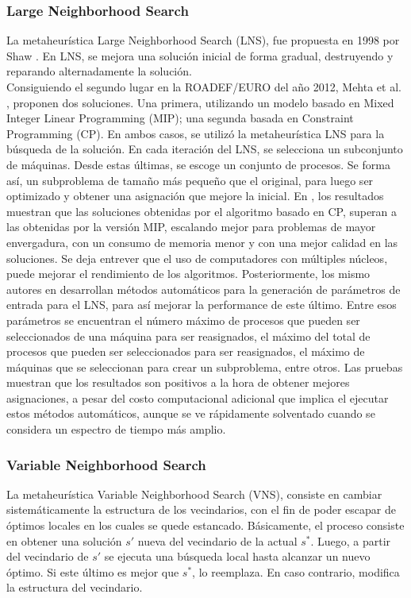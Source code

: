\documentclass[../informe2.tex]{subfiles}
\begin{document}
\subsubsection{Large Neighborhood Search}
La metaheurística Large Neighborhood Search (LNS), fue propuesta en 1998 por Shaw \cite{shaw1998using}. En LNS, se mejora una solución inicial de forma gradual, destruyendo y reparando alternadamente la solución.\\
Consiguiendo el segundo lugar en la ROADEF/EURO del año 2012, Mehta et al. \cite{mehta2012comparing}, proponen dos soluciones. Una primera, utilizando un modelo basado en Mixed Integer Linear Programming (MIP); una segunda basada en Constraint Programming (CP). En ambos casos, se utilizó la metaheurística LNS para la búsqueda de la solución. En cada iteración del LNS, se selecciona un subconjunto de máquinas. Desde estas últimas, se escoge un conjunto de procesos. Se forma así, un subproblema de tamaño más pequeño que el original, para luego ser optimizado y obtener una asignación que mejore la inicial.
En \cite{mehta2012comparing}, los resultados muestran que las soluciones obtenidas por el algoritmo basado en CP, superan a las obtenidas por la versión MIP, escalando mejor para problemas de mayor envergadura, con un consumo de memoria menor y con una mejor calidad en las soluciones. Se deja entrever que el uso de computadores con múltiples núcleos, puede mejorar el rendimiento de los algoritmos. Posteriormente, los mismo autores en \cite{malitsky2013tuning} desarrollan métodos automáticos para la generación de parámetros de entrada para el LNS, para así mejorar la performance de este último. Entre esos parámetros se encuentran el número máximo de procesos que pueden ser seleccionados de una máquina para ser reasignados, el máximo del total de procesos que pueden ser seleccionados para ser reasignados, el máximo de máquinas que se seleccionan para crear un subproblema, entre otros. Las pruebas muestran que los resultados son positivos a la hora de obtener mejores asignaciones, a pesar del costo computacional adicional que implica el ejecutar estos métodos automáticos, aunque se ve rápidamente solventado cuando se considera un espectro de tiempo más amplio. \\

\subsubsection{Variable Neighborhood Search}
La metaheurística Variable Neighborhood Search (VNS), consiste en cambiar sistemáticamente la estructura de los vecindarios, con el fin de poder escapar de óptimos locales en los cuales se quede estancado. Básicamente, el proceso consiste en obtener una solución $s'$ nueva del vecindario de la actual $s^{*}$. Luego, a partir del vecindario de $s'$ se ejecuta una búsqueda local hasta alcanzar un nuevo óptimo. Si este último es mejor que $s^{*}$, lo reemplaza. En caso contrario, modifica la estructura del vecindario. \\
\end{document}
